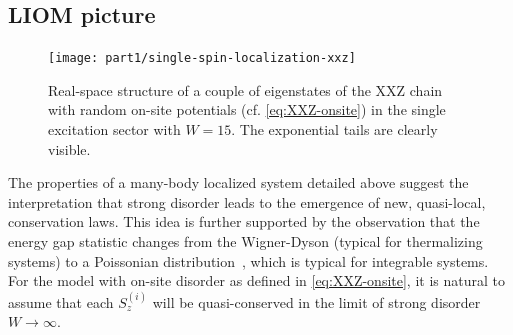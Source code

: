 %

\subsection{LIOM picture}

\begin{figure}[h!]
	\centering
	\texttt{[image: part1/single-spin-localization-xxz]}
	\caption{Real-space structure of a couple of eigenstates of the XXZ chain with random on-site potentials (cf. \autoref{eq:XXZ-onsite}) in the single excitation sector with $W=15$. The exponential tails are clearly visible.}
	\label{fig:xxz-singlespin-exponential-tails}
\end{figure}

The properties of a many-body localized system detailed above suggest the interpretation that strong disorder leads to the emergence of new, quasi-local, conservation laws.
This idea is further supported by the observation that the energy gap statistic changes from the Wigner-Dyson (typical for thermalizing systems) to a Poissonian distribution~\cite{oganesyanLocalizationInteractingFermions2007}, which is typical for integrable systems. For the model with on-site disorder as defined in \autoref{eq:XXZ-onsite}, it is natural to assume that each $S_z^{(i)}$ will be quasi-conserved in the limit of strong disorder $W\rightarrow\infty$.

